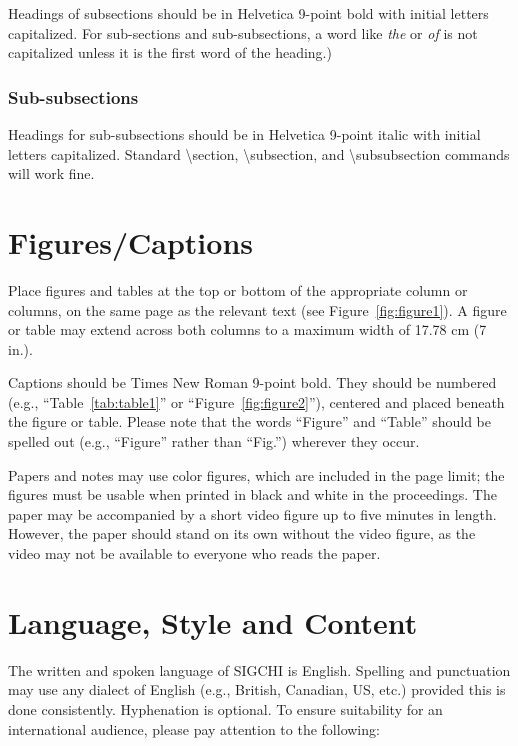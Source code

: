 \documentclass{sigchi-alternate}
\begin{document}
Headings of subsections should be in Helvetica 9-point bold with
initial letters capitalized.  For
sub-sections and sub-subsections, a word like \emph{the} or \emph{of}
is not capitalized unless it is the first word of the heading.)

\subsubsection{Sub-subsections}

Headings for sub-subsections should be in Helvetica 9-point italic
with initial letters capitalized.  Standard {\textbackslash}section,
{\textbackslash}subsection, and {\textbackslash}subsubsection commands
will work fine.

\section{Figures/Captions}

Place figures and tables at the top or bottom of the appropriate
column or columns, on the same page as the relevant text
(see Figure~\ref{fig:figure1}). A figure or table may extend across both
columns to a maximum width of 17.78 cm (7 in.).

Captions should be Times New Roman 9-point bold.  They should be numbered (e.g.,
``Table~\ref{tab:table1}'' or ``Figure~\ref{fig:figure2}''), centered
and placed beneath the figure or table.  Please note that the words
``Figure'' and ``Table'' should be spelled out (e.g., ``Figure''
rather than ``Fig.'') wherever they occur.

Papers and notes may use color figures, which are included in the page
limit; the figures must be usable when printed in black and white in
the proceedings.  The paper may be accompanied by a short video figure
up to five minutes in length.  However, the paper should stand on its
own without the video figure, as the video may not be available to
everyone who reads the paper.

\section{Language, Style and Content}

The written and spoken language of SIGCHI is English. Spelling and
punctuation may use any dialect of English (e.g., British, Canadian,
US, etc.) provided this is done consistently. Hyphenation is
optional. To ensure suitability for an international audience, please
pay attention to the following:
\end{document}
